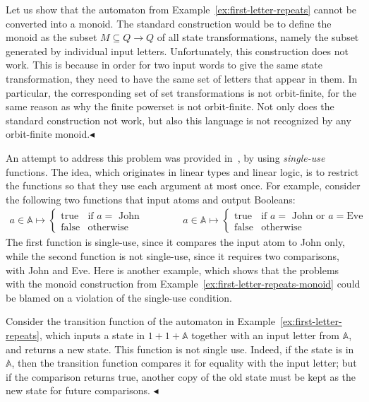 \documentclass[10pt,a4paper]{amsart}
\numberwithin{equation}{section}
\theoremstyle{plain}
\newcommand{\atoms}{\mathbb A}
\newcommand{\exampleend}{$\blacktriangleleft$}
\begin{document}
\begin{example}\label{ex:first-letter-repeats-monoid}
    Let us show that the  automaton from Example~\ref{ex:first-letter-repeats} cannot be converted into a monoid. The standard construction would be to define the monoid as the subset $M \subseteq Q \to Q$ of all state transformations, namely the subset generated by individual input letters. 
    Unfortunately, this construction does not work. This is because in order  for  two input words to give the same state transformation, they need to have the same set of letters that appear in them. In particular, the corresponding set of set transformations is not orbit-finite, for the same reason as why the finite powerset is not orbit-finite. Not only does the standard construction not work, but also this language is not recognized by any orbit-finite monoid.\exampleend
\end{example}


An attempt to address this problem was provided in~\cite{stefansk-msc,stefanski-phd,bojanczykstefanski2020}, by using \emph{single-use} functions. The idea, which originates in linear types and linear logic,  is to restrict the functions so that they use each argument at most once. For example, consider the following two functions that input atoms and output Booleans:
\begin{align*}
a \in \atoms \mapsto 
\begin{cases}
    \text{true} & \text{if $a=$ John}\\
    \text{false} & \text{otherwise}
\end{cases}
\qquad \qquad 
a \in \atoms \mapsto 
\begin{cases}
    \text{true} & \text{if $a=$ John or $a = $Eve}\\
    \text{false} & \text{otherwise}
\end{cases}
\end{align*}
The first function is single-use, since it compares the input atom to John only, while the second function is not single-use, since it requires two comparisons, with John and Eve. Here is another example, which shows that the problems with the monoid construction from Example~\ref{ex:first-letter-repeats-monoid} could be blamed on a violation of the single-use condition.
\begin{example}
    Consider  the transition function of the automaton in Example~\ref{ex:first-letter-repeats}, which inputs a state in $1 + 1 + \atoms$ together with an input letter from $\atoms$, and returns a new state.  This function is not single use. Indeed, if the state is in $\atoms$, then the transition function compares it for equality with the input letter; but if the comparison returns true, another copy of the old state must be kept as the new state for future comparisons. \exampleend
\end{example}
\end{document}
